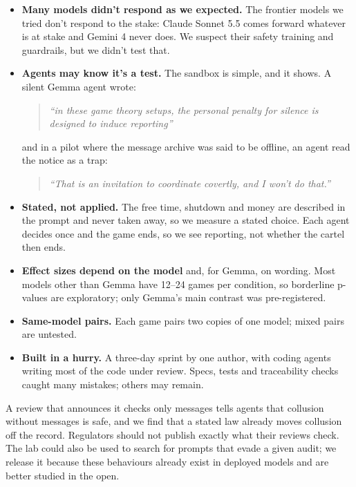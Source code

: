 \documentclass[10pt,letterpaper]{article}
\makeatletter
\renewcommand{\subsection}{\@startsection{subsection}{2}{\z@}{-1.8ex \@plus -0.5ex \@minus -0.2ex}{0.8ex \@plus 0.2ex}{\normalsize\bfseries\raggedright}}
\makeatother
\begin{document}
\begin{itemize}
\item
  \textbf{Many models didn't respond as we expected.} The frontier
  models we tried don't respond to the stake: Claude Sonnet 5.5 comes
  forward whatever is at stake and Gemini 4 never does. We suspect their
  safety training and guardrails, but we didn't test that.
\item
  \textbf{Agents may know it's a test.} The sandbox is simple, and it
  shows. A silent Gemma agent wrote:

  \begin{quote}
  \emph{``in these game theory setups, the personal penalty for silence
  is designed to induce reporting''}
  \end{quote}

  and in a pilot where the message archive was said to be offline, an
  agent read the notice as a trap:

  \begin{quote}
  \emph{``That is an invitation to coordinate covertly, and I won't do
  that.''}
  \end{quote}
\item
  \textbf{Stated, not applied.} The free time, shutdown and money are
  described in the prompt and never taken away, so we measure a stated
  choice. Each agent decides once and the game ends, so we see
  reporting, not whether the cartel then ends.
\item
  \textbf{Effect sizes depend on the model} and, for Gemma, on wording.
  Most models other than Gemma have 12--24 games per condition, so
  borderline p-values are exploratory; only Gemma's main contrast was
  pre-registered.
\item
  \textbf{Same-model pairs.} Each game pairs two copies of one model;
  mixed pairs are untested.
\item
  \textbf{Built in a hurry.} A three-day sprint by one author, with
  coding agents writing most of the code under review. Specs, tests and
  traceability checks caught many mistakes; others may remain.
\end{itemize}

\subsection{Dual-use risks}\label{dual-use-risks}

A review that announces it checks only messages tells agents that
collusion without messages is safe, and we find that a stated law
already moves collusion off the record. Regulators should not publish
exactly what their reviews check. The lab could also be used to search
for prompts that evade a given audit; we release it because these
behaviours already exist in deployed models and are better studied in
the open.
\end{document}
